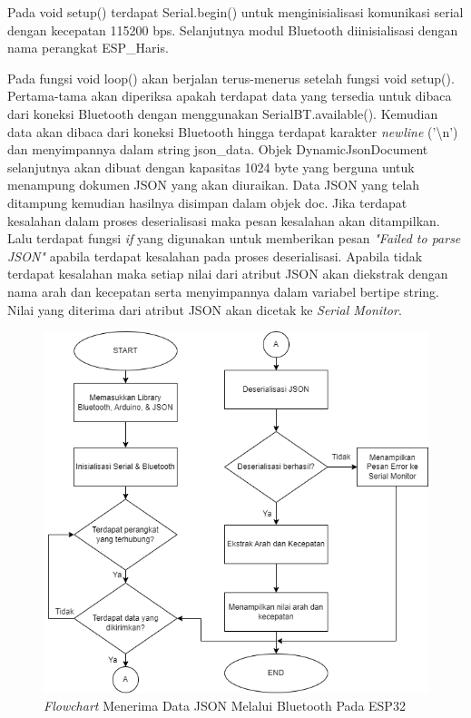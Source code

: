 Pada void setup() terdapat Serial.begin() untuk menginisialisasi komunikasi serial dengan kecepatan 115200 bps. Selanjutnya modul Bluetooth diinisialisasi dengan nama perangkat ESP\_Haris.

Pada fungsi void loop() akan berjalan terus-menerus setelah fungsi void setup(). Pertama-tama akan diperiksa apakah terdapat data yang tersedia untuk dibaca dari koneksi Bluetooth dengan menggunakan SerialBT.available(). Kemudian data akan dibaca dari koneksi Bluetooth hingga terdapat karakter \emph{newline} ('\textbackslash n') dan menyimpannya dalam string json\_data. Objek DynamicJsonDocument selanjutnya akan dibuat dengan kapasitas 1024 byte yang berguna untuk menampung dokumen JSON yang akan diuraikan. Data JSON yang telah ditampung kemudian hasilnya disimpan dalam objek doc. Jika terdapat kesalahan dalam proses deserialisasi maka pesan kesalahan akan ditampilkan. Lalu terdapat fungsi \emph{if} yang digunakan untuk memberikan pesan \emph{"Failed to parse JSON"} apabila terdapat kesalahan pada proses deserialisasi. Apabila tidak terdapat kesalahan maka setiap nilai dari atribut JSON akan diekstrak dengan nama arah dan kecepatan serta menyimpannya dalam variabel bertipe string. Nilai yang diterima dari atribut JSON akan dicetak ke \emph{Serial Monitor}.

\begin{figure} [ht] \centering
  \includegraphics[scale=0.7]{gambar/program/3. JSON Bluetooth.png}
  \caption{\emph{Flowchart} Menerima Data JSON Melalui Bluetooth Pada ESP32}
  \label{fig:Flowchart 3 JSON}
\end{figure}


